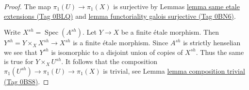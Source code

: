 \documentclass{amsart}
\theoremstyle{plain}
\theoremstyle{definition}
\theoremstyle{remark}
\numberwithin{equation}{subsection}
\def\Spec{\mathop{\mathrm{Spec}}}
\begin{document}
\begin{proof}
The map $\pi_1(U) \to \pi_1(X)$ is surjective by
Lemmas \href{https://stacks.math.columbia.edu/tag/0BLQ}{lemma same etale extensions (Tag 0BLQ)} and
\href{https://stacks.math.columbia.edu/tag/0BN6}{lemma functoriality galois surjective (Tag 0BN6)}.

\medskip\noindent
Write $X^{sh} = \Spec(A^{sh})$. Let $Y \to X$ be a finite \'etale morphism.
Then $Y^{sh} = Y \times_X X^{sh} \to X^{sh}$ is a finite \'etale morphism.
Since $A^{sh}$ is strictly henselian we see that $Y^{sh}$ is isomorphic
to a disjoint union of copies of $X^{sh}$. Thus the same is true for
$Y \times_X U^{sh}$. It follows that the composition
$\pi_1(U^{sh}) \to \pi_1(U) \to \pi_1(X)$ is trivial, see
Lemma \href{https://stacks.math.columbia.edu/tag/0BS8}{lemma composition trivial (Tag 0BS8)}.


\end{proof}
\end{document}
